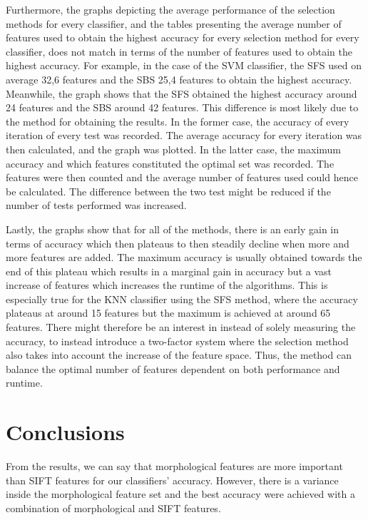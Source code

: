 \documentclass{kththesis}
\begin{document}

Furthermore, the graphs depicting the average performance of the selection methods for every classifier, and the tables presenting the average number of features used to obtain the highest accuracy for every selection method for every classifier, does not match in terms of the number of features used to obtain the highest accuracy. %
For example, in the case of the SVM classifier, the SFS used on average 32,6 features and the SBS 25,4 features to obtain the highest accuracy. Meanwhile, the graph shows that the SFS obtained the highest accuracy around 24 features and the SBS around 42 features. This difference  is most likely due to the method for obtaining the results. In the former case, the accuracy of every iteration of every test was recorded. The average accuracy for every iteration was then calculated, and the graph was plotted. In the latter case, the maximum accuracy and which features constituted the optimal set was recorded. The features were then counted and the average number of features used could hence be calculated. The difference between the two test might be reduced if the number of tests performed was increased. 

Lastly, the graphs  show that for all of the methods, there is an early gain in terms of accuracy which then plateaus to then steadily decline when more and more features are added. The maximum accuracy is usually obtained towards the end of this plateau which results in a marginal gain in accuracy but a vast increase of features which increases the runtime of the algorithms. This is especially true for the KNN classifier using the SFS method, where the accuracy plateaus at around 15 features but the maximum is achieved at around 65 features. There might therefore be an interest in instead of solely measuring the accuracy, to instead introduce a two-factor system where the selection method also takes into account the increase of the feature space. Thus, the method can balance the optimal number of features dependent on both performance and runtime.


\chapter{Conclusions}

From the results, we can say that morphological features are more important than SIFT features for our classifiers' accuracy. However, there is a variance inside the morphological feature set and the best accuracy were achieved with a combination of morphological and SIFT features.
\end{document}
